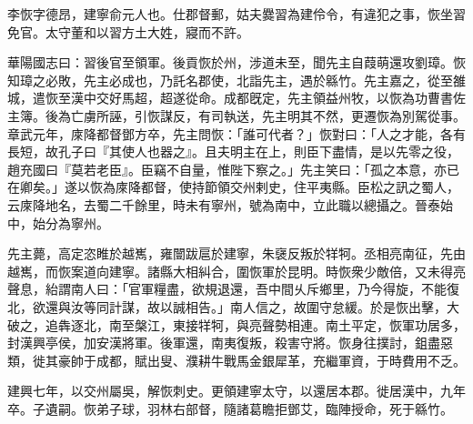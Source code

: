 
\begin{pinyinscope}
李恢字德昂，建寧俞元人也。仕郡督郵，姑夫爨習為建伶令，有違犯之事，恢坐習免官。太守董和以習方土大姓，寢而不許。

華陽國志曰：習後官至領軍。後貢恢於州，涉道未至，聞先主自葭萌還攻劉璋。恢知璋之必敗，先主必成也，乃託名郡使，北詣先主，遇於緜竹。先主嘉之，從至雒城，遣恢至漢中交好馬超，超遂從命。成都旣定，先主領益州牧，以恢為功曹書佐主簿。後為亡虜所誣，引恢謀反，有司執送，先主明其不然，更遷恢為別駕從事。章武元年，庲降都督鄧方卒，先主問恢：「誰可代者？」恢對曰：「人之才能，各有長短，故孔子曰『其使人也器之』。且夫明主在上，則臣下盡情，是以先零之役，趙充國曰『莫若老臣』。臣竊不自量，惟陛下察之。」先主笑曰：「孤之本意，亦已在卿矣。」遂以恢為庲降都督，使持節領交州剌史，住平夷縣。臣松之訊之蜀人，云庲降地名，去蜀二千餘里，時未有寧州，號為南中，立此職以總攝之。晉泰始中，始分為寧州。

先主薨，高定恣睢於越嶲，雍闓跋扈於建寧，朱襃反叛於䍧牱。丞相亮南征，先由越嶲，而恢案道向建寧。諸縣大相糾合，圍恢軍於昆明。時恢衆少敵倍，又未得亮聲息，紿謂南人曰：「官軍糧盡，欲規退還，吾中間乆斥鄉里，乃今得旋，不能復北，欲還與汝等同計謀，故以誠相告。」南人信之，故圍守怠緩。於是恢出擊，大破之，追犇逐北，南至槃江，東接䍧牱，與亮聲勢相連。南土平定，恢軍功居多，封漢興亭侯，加安漢將軍。後軍還，南夷復叛，殺害守將。恢身往撲討，鉏盡惡類，徙其豪帥于成都，賦出叟、濮耕牛戰馬金銀犀革，充繼軍資，于時費用不乏。

建興七年，以交州屬吳，解恢刺史。更領建寧太守，以還居本郡。徙居漢中，九年卒。子遺嗣。恢弟子球，羽林右部督，隨諸葛瞻拒鄧艾，臨陣授命，死于緜竹。


\end{pinyinscope}